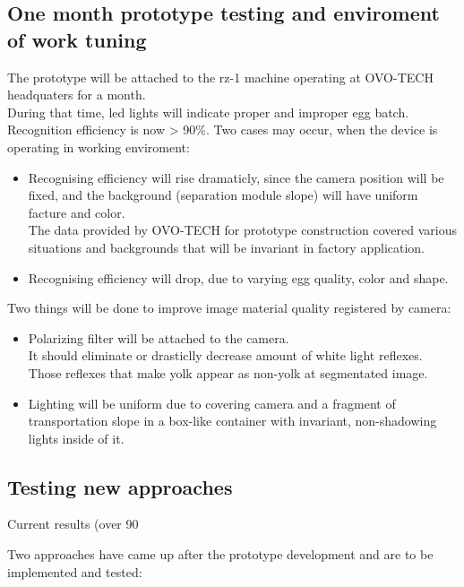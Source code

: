 \documentclass[12pt,twoside,a4paper]{article}
\begin{document}
\subsection{One month prototype testing and enviroment of work tuning}

The prototype will be attached to the rz-1 machine operating at OVO-TECH headquaters for a month.\\
During that time, led lights will indicate proper and improper egg batch.\\
Recognition efficiency is now > 90\%. Two cases may occur, when the device is operating in working enviroment:
\begin{itemize}
\item Recognising efficiency will rise dramaticly, since the camera position will be fixed, and the background (separation module slope) will have uniform facture and color.\\
The data provided by OVO-TECH for prototype construction covered various situations and backgrounds that will be invariant in factory application.
\item Recognising efficiency will drop, due to varying egg quality, color and shape.
\end{itemize}

Two things will be done to improve image material quality registered by camera:
\begin{itemize}
\item Polarizing filter will be attached to the camera.
\\It should eliminate or drasticlly decrease amount of white light reflexes.\\
Those reflexes that make yolk appear as non-yolk at segmentated image.
\item Lighting will be uniform due to covering camera and a fragment of transportation slope in a box-like container with invariant, non-shadowing lights inside of it.\\
\end{itemize}


\subsection{Testing new approaches}
Current results (over 90%

Two approaches have came up after the prototype development and are to be implemented and tested:
\end{document}
